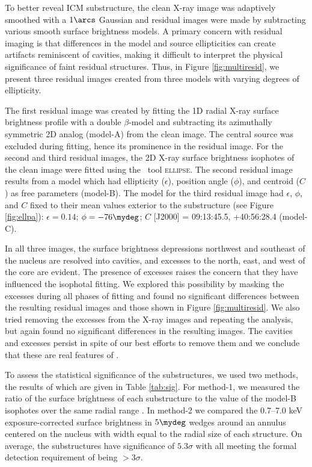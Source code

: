 \documentclass[useAMS,usenatbib]{mn2e}
\begin{document}
To better reveal ICM substructure, the clean X-ray image was
adaptively smoothed with a $1\arcs$ Gaussian and residual images were
made by subtracting various smooth surface brightness models. A
primary concern with residual imaging is that differences in the model
and source ellipticities can create artifacts reminiscent of cavities,
making it difficult to interpret the physical significance of faint
residual structures. Thus, in Figure \ref{fig:multiresid}, we present
three residual images created from three models with varying degrees
of ellipticity.

The first residual image was created by fitting the 1D radial X-ray
surface brightness profile with a double $\beta$-model
\citep{betamodel} and subtracting its azimuthally symmetric 2D analog
(model-A) from the clean image. The central source was excluded during
fitting, hence its prominence in the residual image. For the second
and third residual images, the 2D X-ray surface brightness isophotes
of the clean image were fitted using the \iraf\ tool
\textsc{ellipse}. The second residual image results from a model which
had ellipticity ($\epsilon$), position angle ($\phi$), and centroid
($C$) as free parameters (model-B). The model for the third residual
image had $\epsilon$, $\phi$, and $C$ fixed to their mean values
exterior to the substructure (see Figure \ref{fig:ellpa}): $\epsilon =
0.14$; $\phi = -76\mydeg$; $C$ [J2000] = 09:13:45.5, +40:56:28.4
(model-C).

In all three images, the surface brightness depressions northwest and
southeast of the nucleus are resolved into cavities, and excesses to
the north, east, and west of the core are evident. The presence of
excesses raises the concern that they have influenced the isophotal
fitting. We explored this possibility by masking the excesses during
all phases of fitting and found no significant differences between the
resulting residual images and those shown in Figure
\ref{fig:multiresid}. We also tried removing the excesses from the
X-ray images and repeating the analysis, but again found no
significant differences in the resulting images. The cavities and
excesses persist in spite of our best efforts to remove them and we
conclude that these are real features of \irs.

To assess the statistical significance of the substructures, we used
two methods, the results of which are given in Table
\ref{tab:sig}. For method-1, we measured the ratio of the surface
brightness of each substructure to the value of the model-B isophotes
over the same radial range \citep[see][for a similar
  approach]{hydraa}. In method-2 we compared the 0.7--7.0 keV
exposure-corrected surface brightness in $5\mydeg$ wedges around an
annulus centered on the nucleus with width equal to the radial size of
each structure. On average, the substructures have significance of
$5.3\sigma$ with all meeting the formal detection requirement of being
$>3\sigma$.
\end{document}
